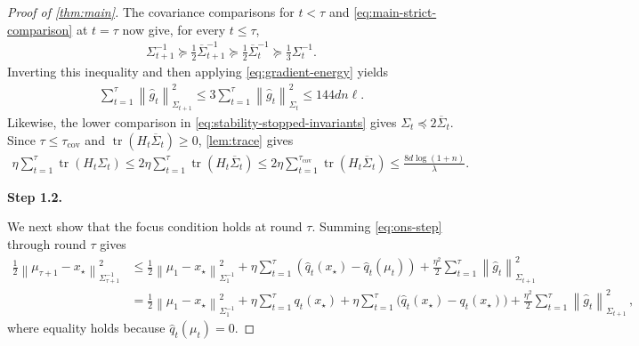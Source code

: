 \documentclass[11pt]{article}
\newcommand{\proofstepinline}[1]{%
    {\sffamily\bfseries\color{blue!55!black}Step #1.}\enspace
}
\newcommand{\tr}{\operatorname{tr}}
\newcommand{\1}{\mathbf 1}
\newcommand{\normm}[2]{\left\lVert #1\right\rVert_{#2}}
\begin{document}
\begin{proof}[Proof of \cref{thm:main}]
    The covariance comparisons for $t<\tau$ and
    \eqref{eq:main-strict-comparison} at $t=\tau$ now give, for every
    $t\leq\tau$,
    \begin{align}
        \Sigma_{t+1}^{-1}
        \succeq
        \frac12\overline\Sigma_{t+1}^{-1}
        \succeq
        \frac12\overline\Sigma_t^{-1}
        \succeq
        \frac13\Sigma_t^{-1}.
    \end{align}
    Inverting this inequality and then applying \eqref{eq:gradient-energy}
    yields
    \begin{align}
        \sum_{t=1}^{\tau}
        \normm{\widehat g_t}{\Sigma_{t+1}}^2
        \leq
        3\sum_{t=1}^{\tau}
        \normm{\widehat g_t}{\Sigma_t}^2
        \leq 144dn\ell.
        \label{eq:main-next-gradient-energy}
    \end{align}
    Likewise, the lower comparison in
    \eqref{eq:stability-stopped-invariants} gives
    $\Sigma_t\preceq2\overline\Sigma_t$.  Since
    $\tau\leq\tau_{\mathrm{cov}}$ and
    $\tr(H_t\overline\Sigma_t)\geq0$, \cref{lem:trace} gives
    \begin{align}
        \eta\sum_{t=1}^{\tau}\tr(H_t\Sigma_t)
        \leq
        2\eta\sum_{t=1}^{\tau}
        \tr(H_t\overline\Sigma_t)
        \leq
        2\eta\sum_{t=1}^{\tau_{\mathrm{cov}}}
        \tr(H_t\overline\Sigma_t)
        \leq\frac{8d\log(1+n)}{\lambda}.
        \label{eq:main-stability-trace}
    \end{align}

    \proofstepinline{1.2}
    We next show that the focus condition holds at round $\tau$.
    Summing \eqref{eq:ons-step} through round $\tau$ gives
    \begin{align}
        \frac12
        \normm{\mu_{\tau+1}-x_\star}{\Sigma_{\tau+1}^{-1}}^2
         & \leq
        \frac12\normm{\mu_1-x_\star}{\Sigma_1^{-1}}^2
        +\eta\sum_{t=1}^{\tau}
        \left(
        \widehat q_t(x_\star)
        -
        \widehat q_t(\mu_t)
        \right)
        +\frac{\eta^2}{2}\sum_{t=1}^{\tau}
        \normm{\widehat g_t}{\Sigma_{t+1}}^2
        \\
         & =
        \frac12\normm{\mu_1-x_\star}{\Sigma_1^{-1}}^2
        +\eta\sum_{t=1}^{\tau}q_t(x_\star)
        +\eta\sum_{t=1}^{\tau}
        \bigl(\widehat q_t(x_\star)-q_t(x_\star)\bigr)
        +\frac{\eta^2}{2}\sum_{t=1}^{\tau}
        \normm{\widehat g_t}{\Sigma_{t+1}}^2\,,
        \label{eq:main-focus-decomposition}
    \end{align}
    where equality holds because $\widehat q_t(\mu_t)=0$.


\end{proof}
\end{document}
